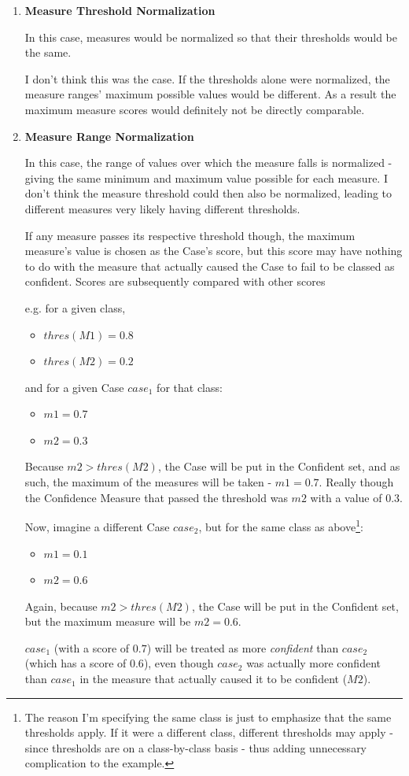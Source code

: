\documentclass[a4paper,11pt]{report}
\begin{document}
\begin{enumerate}
	\item \textbf{Measure Threshold Normalization}
	
	In this case, measures would be normalized so that their thresholds would be the same.
	
	I don't think this was the case. If the thresholds alone were normalized, the measure ranges' maximum possible values would be different. As a result the maximum measure scores would definitely not be directly comparable.
	
	\item \textbf{Measure Range Normalization}
	
	In this case, the range of values over which the measure falls is normalized - giving the same minimum and maximum value possible for each measure. I don't think the measure threshold could then also be normalized, leading to different measures very likely having different thresholds. 
	
	If any measure passes its respective threshold though, the maximum measure's value is chosen as the Case's score, but this score may have nothing to do with the measure that actually caused the Case to fail to be classed as confident. Scores are subsequently compared with other scores
	
	e.g. for a given class, 
	\begin{itemize}
		\item $thres(M1) = 0.8$
		\item $thres(M2) = 0.2$
	\end{itemize}
	and for a given Case $case_{1}$ for that class:
	\begin{itemize}
		\item $m1 = 0.7$
		\item $m2 = 0.3$
	\end{itemize}  
	
	Because $m2 > thres(M2)$, the Case will be put in the Confident set, and as such, the maximum of the measures will be taken - $m1=0.7$. Really though the Confidence Measure that passed the threshold was $m2$ with a value of $0.3$.
	
	Now, imagine a different Case $case_{2}$, but for the same class as above\footnote{The reason I'm specifying the same class is just to emphasize that the same thresholds apply. If it were a different class, different thresholds may apply - since thresholds are on a class-by-class basis - thus adding unnecessary complication to the example.}:
	\begin{itemize}
		\item $m1 = 0.1$
		\item $m2 = 0.6$
	\end{itemize}
	Again, because $m2 > thres(M2)$, the Case will be put in the Confident set, but the maximum measure will be $m2 = 0.6$. 
	
	$case_{1}$ (with a score of $0.7$) will be treated as more \emph{confident} than $case_{2}$ (which has a score of $0.6$), even though $case_{2}$ was actually more confident than $case_{1}$ in the measure that actually caused it to be confident ($M2$).
	
\end{enumerate}
\end{document}
